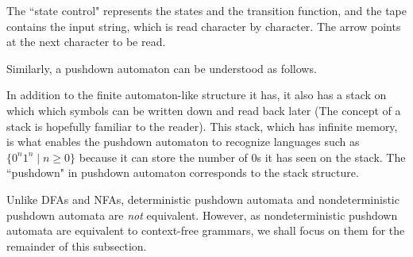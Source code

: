 The ``state control" represents the states and the transition function, and the tape contains the input string, which is read character by character. The arrow points at the next character to be read.

\vspace{3mm}
Similarly, a pushdown automaton can be understood as follows.

\begin{center}
\end{center}

In addition to the finite automaton-like structure it has, it also has a stack on which which symbols can be written down and read back later (The concept of a stack is hopefully familiar to the reader). This stack, which has infinite memory, is what enables the pushdown automaton to recognize languages such as $\{0^n1^n\mid n\geq 0\}$ because it can store the number of $0$s it has seen on the stack. The ``pushdown" in pushdown automaton corresponds to the stack structure.

\vspace{3mm}
Unlike DFAs and NFAs, deterministic pushdown automata and nondeterministic pushdown automata are \textit{not} equivalent. However, as nondeterministic pushdown automata are equivalent to context-free grammars, we shall focus on them for the remainder of this subsection.

